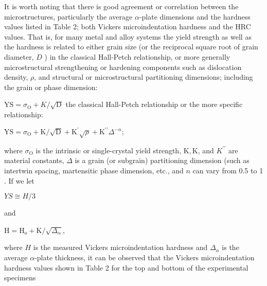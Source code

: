 \documentclass[10pt]{article}
\begin{document}
It is worth noting that there is good agreement or correlation between the microstructures, particularly the average $\alpha$-plate dimensions and the hardness values listed in Table 2; both Vickers microindentation hardness and the HRC values. That is, for many metal and alloy systems the yield strength as well as the hardness is related to either grain size (or the reciprocal square root of grain diameter, $D$ ) in the classical Hall-Petch relationship, or more generally microstructural strengthening or hardening components such as dislocation density, $\rho$, and structural or microstructural partitioning dimensions; including the grain or phase dimension:

$\mathrm{YS}=\sigma_{\mathrm{O}}+K / \sqrt{\mathrm{D}}$ the classical Hall-Petch relationship or the more specific relationship:

$\mathrm{YS}=\sigma_{\mathrm{O}}+\mathrm{K} / \sqrt{\mathrm{D}}+\mathrm{K}^{\prime} \sqrt{\rho}+\mathrm{K}^{\prime \prime} \Delta^{-n} ;$

where $\sigma_{\mathrm{O}}$ is the intrinsic or single-crystal yield strength, $\mathrm{K}, \mathrm{K}$, and $K^{\prime \prime}$ are material constants, $\Delta$ is a grain (or subgrain) partitioning dimension (such as intertwin spacing, martensitic phase dimension, etc., and $n$ can vary from 0.5 to 1 . If we let

$Y S \cong H / 3$

and

$\mathrm{H}=\mathrm{H}_{\mathrm{o}}+\mathrm{K} / \sqrt{\Delta_{\alpha}}$,

where $H$ is the measured Vickers microindentation hardness and $\Delta_{\alpha}$ is the average $\alpha$-plate thickness, it can be observed that the Vickers microindentation hardness values shown in Table 2 for the top and bottom of the experimental specimens
\end{document}
